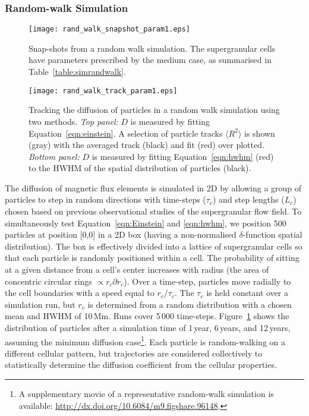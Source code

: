 \subsubsection{Random-walk Simulation}\label{sect:simrandwalk}

 \begin{figure}[!t]
   \centerline{\texttt{[image: rand\_walk\_snapshot\_param1.eps]}}
              \caption[A random walk simulation.]{Snap-shots from a random walk simulation. The supergranular cells have parameters prescribed by the medium case, as summarised in Table~\ref{table:simrandwalk}.}
   \label{fig:randomwalk}
   \end{figure}

 \begin{figure}[!t]
   \centerline{\texttt{[image: rand\_walk\_track\_param1.eps]}}
              \caption[The results of a random walk simulation.]{Tracking the diffusion of particles in a random walk simulation using two methods. \emph{Top panel:} $D$ is measured by fitting Equation~\ref{eqn:einstein}. A selection of particle tracks $\langle R^2 \rangle$ is shown (gray) with the averaged track (black) and fit (red) over plotted. \emph{Bottom panel:} $D$ is measured by fitting Equation~\ref{eqn:hwhm} (red) to the HWHM of the spatial distribution of particles (black).}
   \label{fig:fitrandomwalk}
   \end{figure}

The diffusion of magnetic flux elements is simulated in 2D by allowing a group of particles to step in random directions with time-steps ($\tau_c$) and step lengths ($L_c$) chosen based on previous observational studies of the supergranular flow field. To simultaneously test Equation~\ref{eqn:Einstein} and \ref{eqn:hwhm}, we position 500 particles at position [0,0] in a 2D box (having a non-normalised $\delta$-function spatial distribution). The box is effectively divided into a lattice of supergranular cells so that each particle is randomly positioned within a cell. The probability of sitting at a given distance from a cell's center increases with radius (the area of concentric circular rings $\propto r_c \partial r_c$). Over a time-step, particles move radially to the cell boundaries with a speed equal to $r_c / \tau_c$. The $\tau_c$ is held constant over a simulation run, but $r_c$ is determined from a random distribution with a chosen mean and HWHM of 10\,Mm. Runs cover 5\,000 time-steps. Figure~\ref{fig:randomwalk} shows the distribution of particles after a simulation time of 1\,year, 6\,years, and 12\,years, assuming the minimum diffusion case\footnote{A supplementary movie of a representative random-walk simulation is available: \url{http://dx.doi.org/10.6084/m9.figshare.96148}.}. Each particle is random-walking on a different cellular pattern, but trajectories are considered collectively to statistically determine the diffusion coefficient from the cellular properties. 

